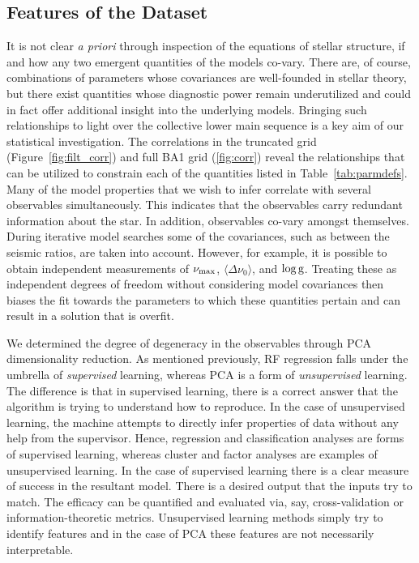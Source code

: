\subsection{Features of the Dataset}
It is not clear \emph{a priori} through inspection of the equations of stellar structure, if and how any two emergent quantities of the models co-vary. 
There are, of course, combinations of parameters whose covariances are well-founded in stellar theory, but there exist quantities whose diagnostic power remain underutilized and could in fact offer additional insight into the underlying models.
Bringing such relationships to light over the collective lower main sequence is a key aim of our statistical investigation. 
The correlations in the truncated grid (Figure~\ref{fig:filt_corr}) and full BA1 grid (\ref{fig:corr}) reveal the relationships that can be utilized to constrain each of the quantities listed in Table~\ref{tab:parmdefs}.
Many of the model properties that we wish to infer correlate with several observables simultaneously.  This indicates that the observables carry redundant information about the star. 
In addition, observables co-vary amongst themselves. During  iterative model searches some of the covariances, such as between the seismic ratios, are taken into account.  However, for example, it is possible to obtain independent measurements of $\nu_{\rm{max}}$, $\langle\Delta\nu_0\rangle$, and $\log \rm{g}$. Treating these as independent degrees of freedom without considering model covariances then biases the fit towards the parameters to which these quantities pertain and can result in a solution that is overfit. 

We determined the degree of degeneracy in the observables through PCA dimensionality reduction. 
As mentioned previously, RF regression falls under the umbrella of \emph{supervised} learning, whereas PCA is a form of \emph{unsupervised} learning. 
The difference is that in supervised learning, there is a correct answer that the algorithm is trying to understand how to reproduce.
In the case of unsupervised learning, the machine attempts to directly infer properties of data without any help from the supervisor. Hence, regression and classification analyses are forms of supervised learning, whereas cluster and factor analyses are examples of unsupervised learning.
In the case of supervised learning there is a clear measure of success in the resultant model. 
There is a desired output that the inputs try to match. 
The efficacy can be quantified and evaluated via, say, cross-validation or information-theoretic metrics. 
Unsupervised learning methods simply try to identify features and in the case of PCA these features are not necessarily interpretable. 

